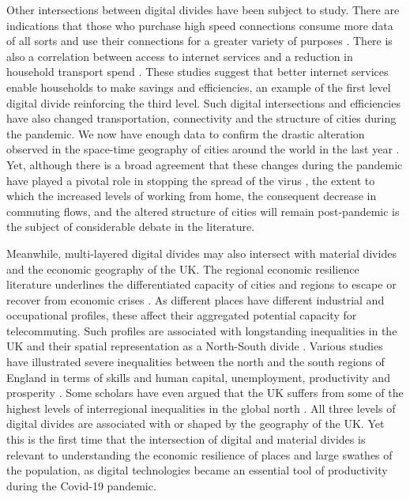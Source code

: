 \documentclass[]{interact}
\theoremstyle{plain}%
\theoremstyle{definition}
\theoremstyle{remark}
\begin{document}
Other intersections between digital divides have been subject to study.
There are indications that those who purchase high speed connections
consume more data of all sorts and use their connections for a greater
variety of purposes \citep{hauge2011consumer}. There is also a
correlation between access to internet services and a reduction in
household transport spend \citep{bris2017ict}. These studies suggest
that better internet services enable households to make savings and
efficiencies, an example of the first level digital divide reinforcing
the third level. Such digital intersections and efficiencies have also
changed transportation, connectivity and the structure of cities during
the pandemic. We now have enough data to confirm the drastic alteration
observed in the space-time geography of cities around the world in the
last year \citep[e.g.~][]{google2020, shibayama2021impact}. Yet,
although there is a broad agreement that these changes during the
pandemic have played a pivotal role in stopping the spread of the virus
\citep{jia2020population, yang2020taking, mu2020interplay}, the extent
to which the increased levels of working from home, the consequent
decrease in commuting flows, and the altered structure of cities will
remain post-pandemic is the subject of considerable debate in the
literature.

Meanwhile, multi-layered digital divides may also intersect with
material divides and the economic geography of the UK. The regional
economic resilience literature underlines the differentiated capacity of
cities and regions to escape or recover from economic crises
\citep{martin2012regional, kitsos2018economic}. As different places have
different industrial and occupational profiles, these affect their
aggregated potential capacity for telecommuting. Such profiles are
associated with longstanding inequalities in the UK and their spatial
representation as a North-South divide \citep{martin_north_south}.
Various studies have illustrated severe inequalities between the north
and the south regions of England in terms of skills and human capital,
unemployment, productivity and prosperity
\citep{lee2014grim, mccann2020perceptions, dorling2018peak}. Some
scholars have even argued that the UK suffers from some of the highest
levels of interregional inequalities in the global north
\citep{gal2018reducing, mccann2016uk}. All three levels of digital
divides are associated with or shaped by the geography of the UK. Yet
this is the first time that the intersection of digital and material
divides is relevant to understanding the economic resilience of places
and large swathes of the population, as digital technologies became an
essential tool of productivity during the Covid-19 pandemic.
\end{document}
